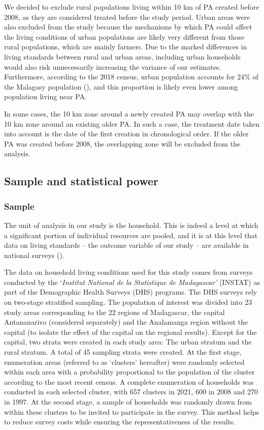 \documentclass[
]{article}
\begin{document}
We decided to exclude rural populations living within 10 km of PA
created before 2008, as they are considered treated before the study
period. Urban areas were also excluded from the study because the
mechanisms by which PA could affect the living conditions of urban
populations are likely very different from those rural populations,
which are mainly farmers. Due to the marked differences in living
standards between rural and urban areas, including urban households
would also risk unnecessarily increasing the variance of our estimates.
Furthermore, according to the 2018 census, urban population accounts for
24\% of the Malagasy population
(), and this
proportion is likely even lower among population living near PA.

In some cases, the 10 km zone around a newly created PA may overlap with
the 10 km zone around an existing older PA. In such a case, the
treatment date taken into account is the date of the first creation in
chronological order. If the older PA was created before 2008, the
overlapping zone will be excluded from the analysis.

\subsection{Sample and statistical
power}\label{sample-and-statistical-power}

\subsubsection{Sample}\label{sample}

The unit of analysis in our study is the household. This is indeed a
level at which a significant portion of individual resources are pooled,
and it is at this level that data on living standards -- the outcome
variable of our study -- are available in national surveys
().

The data on household living conditions used for this study comes from
surveys conducted by the `\emph{Institut National de la Statistique de
Madagascar'} (INSTAT) as part of the Demographic Health Surveys (DHS)
programs. The DHS surveys rely on two-stage stratified sampling. The
population of interest was divided into 23 study areas corresponding to
the 22 regions of Madagascar, the capital Antananarivo (considered
separately) and the Analamanga region without the capital (to isolate
the effect of the capital on the regional results). Except for the
capital, two strata were created in each study area: The urban stratum
and the rural stratum. A total of 45 sampling strata were created. At
the first stage, enumeration areas (referred to as `clusters' hereafter)
were randomly selected within each area with a probability proportional
to the population of the cluster according to the most recent census. A
complete enumeration of households was conducted in each selected
cluster, with 657 clusters in 2021, 600 in 2008 and 270 in 1997. At the
second stage, a sample of households was randomly drawn from within
these clusters to be invited to participate in the survey. This method
helps to reduce survey costs while ensuring the representativeness of
the results.
\end{document}
